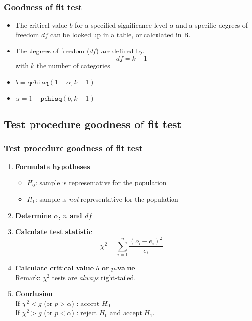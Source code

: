 \documentclass{beamer}
\begin{document}
\begin{frame}
\frametitle{Goodness of fit test}

\begin{itemize}
    \item The critical value $b$ for a specified significance level $\alpha$ and a specific degrees of freedom $df$ can be looked up in a table, or calculated in R.
\vfill
    \item The degrees of freedom ($df$) are defined by:
    \[ df = k -1 \]
    with $k$ the number of categories
\vfill 
    \item $b = \texttt{qchisq}(1-\alpha,k-1)$
    \item $\alpha = 1-\texttt{pchisq}(b,k-1)$
\end{itemize}
\end{frame}

\subsection{Test procedure goodness of fit test}

\begin{frame}
  \frametitle{Test procedure goodness of fit test}
  \begin{enumerate}
  \item \textbf{Formulate hypotheses}
    \begin{itemize}
      \item $H_{0}$: sample is representative for the population
      \item $H_{1}$: sample is \emph{not} representative for the population
    \end{itemize}
  \item \textbf{Determine $\alpha$, $n$ and $df$}
  \item \textbf{Calculate test statistic}
  \[ \chi^{2} = \sum_{i=1}^{n} \frac{(o_{i} - e_{i})^{2}}{e_{i}} \]
  \item \textbf{Calculate critical value $b$ or $p$-value}\\
  Remark: $\chi^2$ tests are \emph{always} right-tailed.
  \item \textbf{Conclusion}\\
   If $\chi^2 < g$ (or $p > \alpha$) : accept $H_{0}$\\
   If $\chi^2 > g$ (or $p < \alpha$) : reject $H_{0}$ and accept $H_{1}$.
\end{enumerate}
\end{frame}
\end{document}
